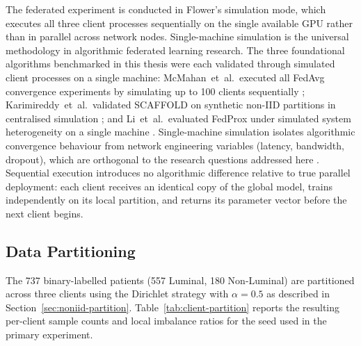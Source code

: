 The federated experiment is conducted in Flower's simulation
mode, which executes all three client processes sequentially
on the single available GPU rather than in parallel across
network nodes.
Single-machine simulation is the universal methodology
in algorithmic federated learning research.
The three foundational algorithms benchmarked in this
thesis were each validated through simulated client
processes on a single machine: McMahan~et~al.\ executed
all FedAvg convergence experiments by simulating up to
100 clients sequentially \cite{mcmahan2017fedavg};
Karimireddy~et~al.\ validated SCAFFOLD on synthetic
non-IID partitions in centralised simulation
\cite{karimireddy2020scaffold}; and Li~et~al.\ evaluated
FedProx under simulated system heterogeneity on a single
machine \cite{li2020fedprox}.
Single-machine simulation isolates algorithmic convergence
behaviour from network engineering variables (latency,
bandwidth, dropout), which are orthogonal to the research
questions addressed here \cite{beutel2022flower}.
Sequential execution introduces no algorithmic difference
relative to true parallel deployment: each client receives
an identical copy of the global model, trains independently
on its local partition, and returns its parameter vector
before the next client begins.

\subsection{Data Partitioning}
\label{sec:data-partitioning}

The 737 binary-labelled patients (557 Luminal, 180
Non-Luminal) are partitioned across three clients using the
Dirichlet strategy with $\alpha = 0.5$ as described in
Section~\ref{sec:noniid-partition}.
Table~\ref{tab:client-partition} reports the resulting
per-client sample counts and local imbalance ratios for the
seed used in the primary experiment.

